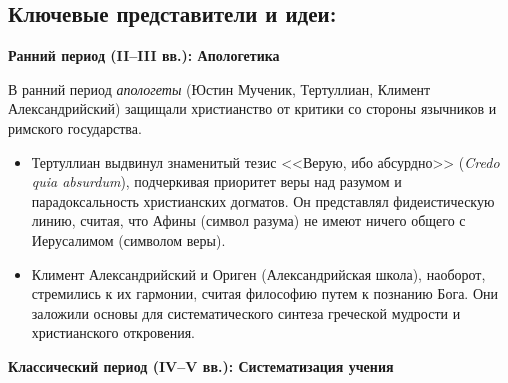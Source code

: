 \documentclass[12pt,a4paper]{article}
\begin{document}
	\subsection{Ключевые представители и идеи:}
	\textbf{Ранний период (II–III вв.): Апологетика}
	
	В ранний период \textit{апологеты} (Юстин Мученик, Тертуллиан, Климент Александрийский) защищали христианство от критики со стороны язычников и римского государства.
	\begin{itemize}
		\item Тертуллиан выдвинул знаменитый тезис <<Верую, ибо абсурдно>> (\textit{Credo quia absurdum}), подчеркивая приоритет веры над разумом и парадоксальность христианских догматов. Он представлял фидеистическую линию, считая, что Афины (символ разума) не имеют ничего общего с Иерусалимом (символом веры).
		\item Климент Александрийский и Ориген (Александрийская школа), наоборот, стремились к их гармонии, считая философию путем к познанию Бога. Они заложили основы для систематического синтеза греческой мудрости и христианского откровения.
	\end{itemize}
	
	\textbf{Классический период (IV–V вв.): Систематизация учения}
	
\end{document}
